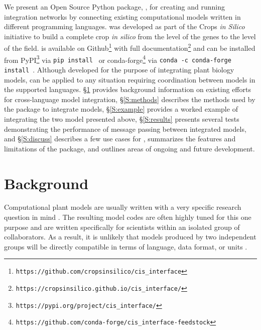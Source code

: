 \documentclass[journal]{IEEEtran}
\newcommand{\todo}[1]{{\color{red}{#1}}}
\newcommand{\pkg}{{\tt \todo{cis\_interface}}{}}
\begin{document}
We present an Open Source Python package, {\pkg}, for creating and running integration networks by connecting existing computational models written in different programming languages. {\pkg} was developed as part of the Crops \emph{in Silico} \citep{Marshall-Colon2017} initiative to build a complete crop \emph{in silico} from the level of the genes to the level of the field. {\pkg} is available on Github\footnote{{\tt https://github.com/cropsinsilico/cis\_interface}} with full documentation\footnote{{\tt https://cropsinsilico.github.io/cis\_interface/}} and can be installed from PyPI\footnote{{\tt https://pypi.org/project/cis\_interface/}} via {\tt pip install {\pkg}} or conda-forge\footnote{{\tt https://github.com/conda-forge/cis\_interface-feedstock}} via {\tt conda -c conda-forge install {\pkg}}. Although developed for the purpose of integrating plant biology models, {\pkg} can be applied to any situation requiring coordination between models in the supported languages. \S\ref{S:background} provides background information on existing efforts for cross-language model integration, \S\ref{S:methods} describes the methods used by the {\pkg} package to integrate models, \S\ref{S:example} provides a worked example of integrating the two model presented above, \S\ref{S:results} presents several tests demonstrating the performance of message passing between integrated models, and \S\ref{S:discuss} describes a few use cases for {\pkg}, 
summarizes the features and limitations of the {\pkg} package, and outlines areas of ongoing and future development.

\section{Background}\label{S:background}
%
Computational plant models are usually written with a very specific research question in mind \citep[e.g. describing a specific metabolic pathway in C4 photosynthesis,][]{Wang2014}. The resulting model codes are often highly tuned for this one purpose and are written specifically for scientists within an isolated group of collaborators. As a result, it is unlikely that models produced by two independent groups will be directly compatible in terms of language, data format, or units \citep{Marshall-Colon2017}. 
\end{document}
